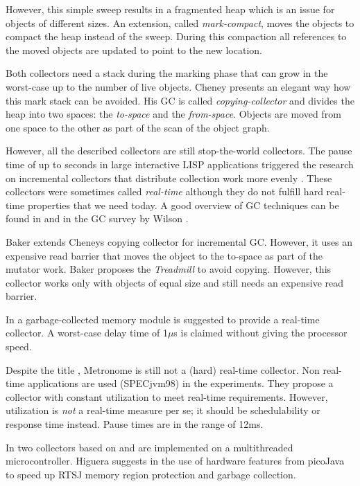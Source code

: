 However, this simple sweep results in a fragmented heap which is an
issue for objects of different sizes. An extension, called
\emph{mark-compact}, moves the objects to compact the heap instead
of the sweep. During this compaction all references to the moved
objects are updated to point to the new location.


Both collectors need a stack during the marking phase that can grow
in the worst-case up to the number of live objects. Cheney
\cite{gc:cheney70} presents an elegant way how this mark stack can
be avoided. His GC is called \emph{copying-collector} and divides
the heap into two spaces: the \emph{to-space} and the
\emph{from-space}. Objects are moved from one space to the other as
part of the scan of the object graph.

However, all the described collectors are still stop-the-world
collectors. The pause time of up to seconds in large interactive
LISP applications triggered the research on incremental collectors
that distribute collection work more evenly \cite{gc:steele75,
gc:dijkstra78, gc:baker78}. These collectors were sometimes called
\emph{real-time} although they do not fulfill hard real-time
properties that we need today. A good overview of GC techniques can
be found in \cite{gc:jone96} and in the GC survey by Wilson
\cite{gc:wils94}.

Baker \cite{gc:baker78} extends Cheneys \cite{gc:cheney70} copying
collector for incremental GC. However, it uses an expensive read
barrier that moves the object to the to-space as part of the mutator
work. Baker proposes the \emph{Treadmill} \cite{gc:baker92} to avoid
copying. However, this collector works only with objects of equal
size and still needs an expensive read barrier.

In \cite{gc:hwgc94} a garbage-collected memory module is suggested to
provide a real-time collector. A worst-case delay time of 1$\mu$s is
claimed without giving the processor speed.

Despite the title \cite{gc:bacon03}, Metronome is still not a (hard)
real-time collector. Non real-time applications are used (SPECjvm98)
in the experiments. They propose a collector with constant
utilization to meet real-time requirements. However, utilization is
\emph{not} a real-time measure per se; it should be schedulability or
response time instead. Pause times are in the range of 12ms.

In \cite{gc:pfeffer04} two collectors based on \cite{gc:dijkstra78}
and \cite{gc:baker92} are implemented on a multithreaded
microcontroller.  Higuera suggests in \cite{gc:higu02} the use of
hardware features from picoJava to speed up RTSJ memory region
protection and garbage collection.

